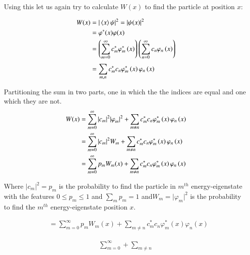 Using this let us again try to calculate $W(x)$ to find the particle at position $x$:

\begin{align}\label{eq:23}
W{(x)}&=\vert\braket{x}{\psi}\vert^{2}=\vert{\psi}(x)\vert^{2}\notag\\
&={\varphi}^{*}{(x)}\varphi{(x)}\notag\\
&=\left(\sum _{ m=0 }^{ \infty  }{ { c }_{ m }^{ * } } { \varphi  }_{ m }^{ * }\left( x \right)\right)\left(\sum _{ n=0 }^{ \infty  }{ { c }_{ n } } { \varphi  }_{ n }\left( x \right)\right)\notag\\
&=\sum _{ m,n }^{  }{ { c }_{ m }^{ * } } { c }_{ n }{ \varphi  }_{ m }^{ * }\left( x \right){ \varphi  }_{ n }\left( x \right)
\end{align}

Partitioning the sum in two parts, one in which the the indices are equal and one which they are not. 
\begin{align}\label{eq:24}
W(x)&=\sum _{ m=0 }^{ \infty  }\vert{ { c }_{ m }\vert^{2} }{\vert\varphi}_{m}\vert^{2}+ \sum _{ m\neq n }^{  }{ { c }_{ m }^{ * } } { c }_{ n }{ \varphi  }_{ m }^{ * }\left( x \right){ \varphi  }_{ n }\left( x \right)\notag\\
&=\sum _{ m=0 }^{ \infty  }\vert{ {c } _{ m }\vert^{2} }{W}_{m}+ \sum _{ m\neq n }^{  }{ { c }_{ m }^{ * } } { c }_{ n }{ \varphi  }_{ m }^{ * }\left( x \right){ \varphi  }_{ n }\left( x \right)\notag\\
&=\sum _{ m=0 }^{ \infty  }{p}_{m}{W}_{m}(x) + \sum _{ m\neq n }^{  }{ { c }_{ m }^{ * } } { c }_{ n }{ \varphi  }_{ m }^{ * }\left( x \right){ \varphi  }_{ n }\left( x \right)
\end{align}

Where $\vert{{c}_{m}\vert^{2}}={p}_{m}$ is the probability to find the particle in ${m}^{th}$ energy-eigenstate with the features ${0}\le{p}_{m}\le{1}$ and ${\sum _{ m}{p}_{m} =1}$ and\thinspace ${W}_{m}={\vert\varphi}_{m}\vert^{2}$ is the probability to find the ${m}^{th}$ energy-eigenstate position ${x}$.

\begin{align}\label{eq:25}
&=\sum _{ m=0 }^{ \infty  }{p}_{m}{W}_{m}{(x)}+ \sum _{ m\neq n }^{  }{ { c }_{ m }^{ * } } { c }_{ n }{ \varphi  }_{ m }^{ * }\left( x \right){ \varphi  }_{ n }\left( x \right)
\end{align}

\begin{align}\label{eq:26}
\sum _{ m=0 }^{ \infty  }+ \sum _{ m\neq n }^{  }  
\end{align}


